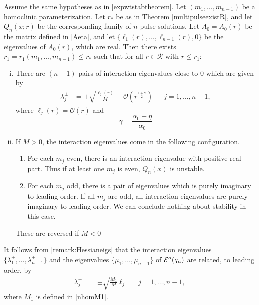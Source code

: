 \documentclass[thesis.tex]{subfiles}
\begin{document}
\begin{corollary}\label{corr:eiglocR}
Assume the same hypotheses as in \cref{expwtstabtheorem}. Let $(m_1, \dots, m_{n-1})$ be a homoclinic parameterization. Let $r_*$ be as in Theorem \ref{multipulseexistR}, and let $Q_n(x; r)$ be the corresponding family of $n$-pulse solutions. Let $A_0 = A_0(r)$ be the matrix defined in \cref{Aeta}, and let $\{ \ell_1(r), \dots, \ell_{n-1}(r), 0 \}$ be the eigenvalues of $A_0(r)$, which are real. Then there exists $r_1 = r_1(m_1, \dots, m_{n-1}) \leq r_*$ such that for all $r \in \mathcal{R}$ with $r \leq r_1$:
\begin{enumerate}[(i)]
\item There are $(n-1)$ pairs of interaction eigenvalues close to 0 which are given by
\begin{align}\label{hominteigs}
\lambda_j^\pm &= \pm \sqrt{ \frac{\ell_j(r)}{M}} + 
\mathcal{O}\left( r^{\frac{1 + \gamma}{2}} \right) && j = 1,\dots,n-1,
\end{align}
where $\ell_j(r) = \mathcal{O}(r)$ and
\[
\gamma = \frac{\alpha_0 - \eta}{\alpha_0}
\]
\item If $M > 0$, the interaction eigenvalues come in the following configuration.
\begin{enumerate}
	\item For each $m_j$ even, there is an interaction eigenvalue with positive real part. Thus if at least one $m_j$ is even, $Q_n(x)$ is unstable.
	\item For each $m_j$ odd, there is a pair of eigenvalues which is purely imaginary to leading order. If all $m_j$ are odd, all interaction eigenvalues are purely imaginary to leading order. We can conclude nothing about stability in this case.
\end{enumerate}
These are reversed if $M < 0$
\end{enumerate}
\end{corollary}

\begin{remark}\label{remark:eigrelation}
It follows from \cref{remark:Hessianeigs} that the interaction eigenvalues $\{ \lambda_1^\pm, \dots, \lambda_{n-1}^\pm \}$ and the eigenvalues $\{ \mu_1, \dots, \mu_{n-1} \}$ of $\mathcal{E}''(q_n)$ are related, to leading order, by
\begin{align}\label{eigrelation}
\lambda_j^\pm &= \pm \sqrt{ \frac{M_1}{M} \ell_j} && j = 1, \dots, n-1,
\end{align}
where $M_1$ is defined in \cref{nhomM1}.
\end{remark}
\end{document}
